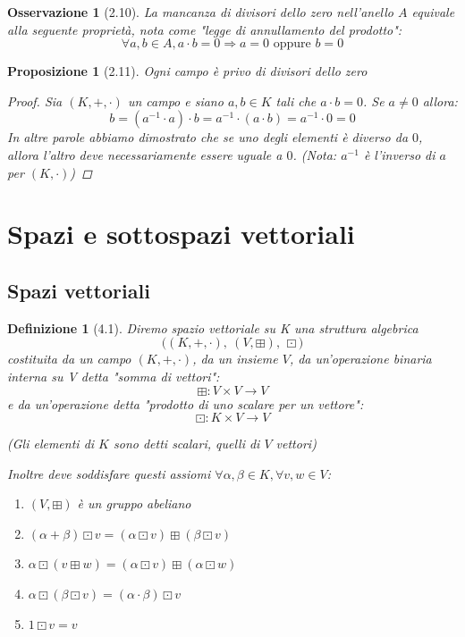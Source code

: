 \documentclass[11pt,a4paper]{article}
\theoremstyle{manuale}
\newtheorem*{definizione}{Definizione}
\newtheorem*{proposizione}{Proposizione}
\newtheorem*{osservazione}{Osservazione}
\theoremstyle{manualecorsivo}
\begin{document}
	
	\begin{osservazione}[2.10]
		La mancanza di divisori dello zero nell'anello $A$ equivale alla seguente proprietà, nota come "legge di annullamento del prodotto":
		$$\forall a,b \in A, a \cdot b = 0\Rightarrow a = 0 \text{ oppure } b=0$$
	\end{osservazione}
	
	\begin{proposizione}[2.11]
		Ogni campo è privo di divisori dello zero
		\begin{proof}
			Sia $(K, +, \cdot)$ un campo e siano $a,b \in K$ tali che $a \cdot b = 0$. Se $a \neq 0$ allora:
			$$b = (a^{-1} \cdot a) \cdot b = a^{-1} \cdot (a \cdot b) = a^{-1} \cdot 0 = 0$$
			In altre parole abbiamo dimostrato che se uno degli elementi è diverso da $0$, allora l'altro deve necessariamente essere uguale a $0$. \textit{(Nota: $a^{-1}$ è l'inverso di $a$ per $(K, \cdot)$)}
		\end{proof}
	\end{proposizione}
	
	\newpage
	\section{Spazi e sottospazi vettoriali}
	\subsection{Spazi vettoriali}
	\begin{definizione}[4.1]
		Diremo spazio vettoriale su K una struttura algebrica $$\big((K,+,\cdot),\ (V,\boxplus),\ \boxdot\big)$$ costituita da un campo $(K,+,\cdot)$, da un insieme $V$, da un'operazione binaria interna su V detta "somma di vettori":
		$$\boxplus: V \times V \rightarrow V$$
		e da un'operazione detta "prodotto di uno scalare per un vettore":
		$$\boxdot: K \times V \rightarrow V$$
		
		\textit{(Gli elementi di $K$ sono detti scalari, quelli di $V$ vettori)}
		
		Inoltre deve soddisfare questi assiomi $\forall \alpha, \beta \in K, \forall v, w \in V$:
		\begin{enumerate}
			\item $(V, \boxplus)$ è un gruppo abeliano
			\item $(\alpha + \beta) \boxdot v = (\alpha \boxdot v) \boxplus (\beta \boxdot v)$
			\item $\alpha \boxdot (v \boxplus w) = (\alpha \boxdot v) \boxplus (\alpha \boxdot w)$
			\item $\alpha \boxdot (\beta \boxdot v) = (\alpha \cdot \beta) \boxdot v$
			\item $1 \boxdot v = v$
		\end{enumerate}
	\end{definizione}
	
\end{document}
